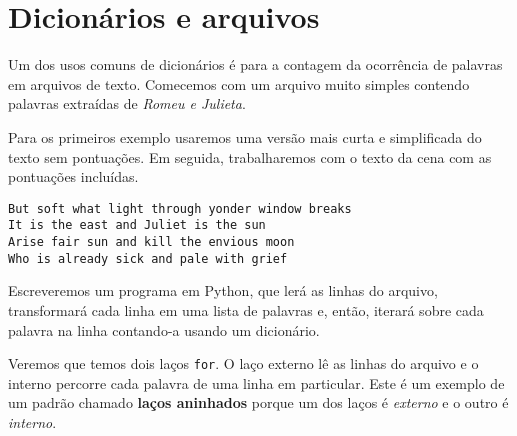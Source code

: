 \section{Dicionários e arquivos}

Um dos usos comuns de dicionários é para a contagem da ocorrência de palavras em arquivos de texto.
Comecemos com um arquivo muito simples contendo palavras extraídas de \emph{Romeu e Julieta}.

Para os primeiros exemplo usaremos uma versão mais curta e simplificada do texto sem pontuações. Em seguida, trabalharemos com o texto da cena com as pontuações incluídas.

\beforeverb
\begin{verbatim}
But soft what light through yonder window breaks
It is the east and Juliet is the sun
Arise fair sun and kill the envious moon
Who is already sick and pale with grief
\end{verbatim}
\afterverb
%
Escreveremos um programa em Python, que lerá as linhas do arquivo, transformará cada linha em uma lista de palavras e, então, iterará sobre cada palavra na linha contando-a usando um dicionário.

Veremos que temos dois laços {\tt for}. O laço externo lê as linhas do arquivo e o interno percorre cada palavra de uma linha em particular. Este é um exemplo de um padrão chamado {\bf laços aninhados} porque um dos laços é \emph{externo} e o outro é \emph{interno}.

